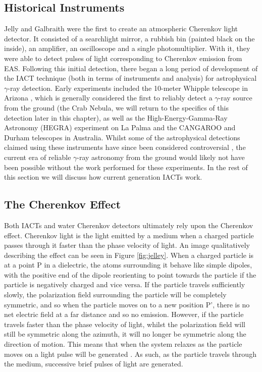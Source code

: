 \subsection{Historical Instruments}
Jelly and Galbraith \cite{G+J} were the first to create an atmospheric Cherenkov light detector. It consisted of a searchlight mirror, a rubbish bin (painted black on the inside), an amplifier, an oscilloscope and a single photomultiplier. With it, they were able to detect pulses of light corresponding to Cherenkov emission from EAS. Following this initial detection, there began a long period of development of the IACT technique (both in terms of instruments and analysis) for astrophysical $\gamma$-ray detection. Early experiments included the 10-meter Whipple telescope in Arizona \cite{whipple}, which is generally considered the first to reliably detect a $\gamma$-ray source from the ground (the Crab Nebula, we will return to the specifics of this detection later in this chapter), as well as the High-Energy-Gamma-Ray Astronomy (HEGRA) experiment on La Palma \cite{HEGRA} and the CANGAROO \cite{CANGAROO} and Durham \cite{DURHAM} telescopes in Australia. Whilst some of the astrophysical detections claimed using these instruments have since been considered controversial \cite{hintonicrc30}, the current era of reliable $\gamma$-ray astronomy from the ground would likely not have been possible without the work performed for these experiments. In the rest of this section we will discuss how current generation IACTs work. 

\subsection{The Cherenkov Effect}
Both IACTs and water Cherenkov detectors ultimately rely upon the Cherenkov effect. Cherenkov light is the light emitted by a medium when a charged particle passes through it faster than the phase velocity of light. An image qualitatively describing the effect can be seen in Figure \ref{fig:jelley}. When a charged particle is at a point P in a dielectric, the atoms surrounding it behave like simple dipoles, with the positive end of the dipole reorienting to point towards the particle if the particle is negatively charged and vice versa. If the particle travels sufficiently slowly, the polarization field surrounding the particle will be completely symmetric, and so when the particle moves on to a new position P', there is no net electric field at a far distance and so no emission. However, if the particle travels faster than the phase velocity of light, whilst the polarization field will still be symmetric along the azimuth, it will no longer be symmetric along the direction of motion. This means that when the system relaxes as the particle moves on a light pulse will be generated \cite{jelley}. As such, as the particle travels through the medium, successive brief pulses of light are generated. 

